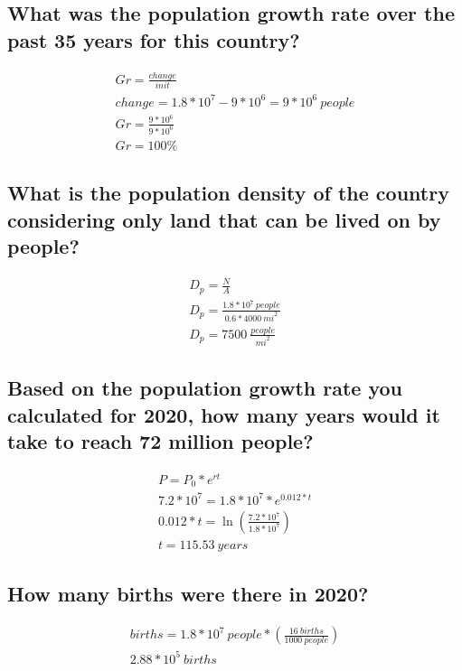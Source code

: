 \documentclass{article}
\begin{document}
\subsection{What was the population growth rate over the past 35 years for this
country?}

\begin{gather}
    Gr = \frac{change}{init} \\
    change = 1.8 * 10^7 - 9 * 10^6 = 9 * 10^6 \ people \\
    Gr = \frac{9 * 10^6}{9 * 10^6} \\
    Gr = 100\%
\end{gather}

\subsection{What is the population density of the country considering only land
that can be lived on by people?}

\begin{gather}
    D_p = \frac{N}{A} \\
    D_p = \frac{1.8 * 10^7\ people}{0.6*4000\ mi^2} \\
    D_p = 7500\ \frac{people}{mi^2}
\end{gather}

\subsection{Based on the population growth rate you calculated for 2020, how
many years would it take to reach 72 million people?}

\begin{gather}
    P = P_0 * e^{rt} \\
    7.2 * 10^7 = 1.8 * 10^7 * e^{0.012 * t} \\
    0.012 * t = \ln{\left(\frac{7.2 * 10^7}{1.8 * 10^7}\right)} \\
    t = 115.53\ years
\end{gather}

\subsection{How many births were there in 2020?}

\begin{gather}
    births = 1.8 * 10^7\ people * \left(\frac{16\ births}{1000\ people}\right) \\
    2.88 * 10^5\ births
\end{gather}
\end{document}
